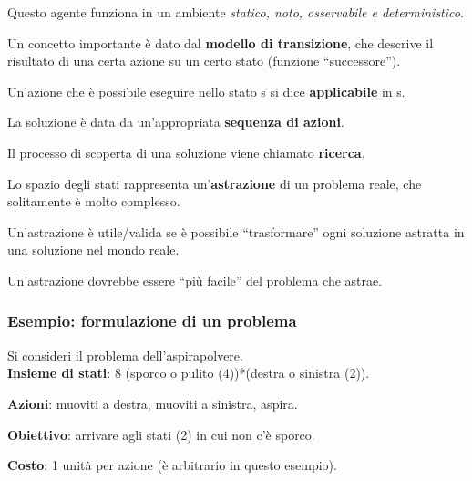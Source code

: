 Questo agente funziona in un ambiente \textit{statico, noto, osservabile e
deterministico}.

Un concetto importante è dato dal \textbf{modello di transizione}, che
descrive il risultato di una certa azione su un certo stato
(funzione ``successore'').

Un'azione che è possibile eseguire nello stato s si dice \textbf{applicabile}
in s.

La soluzione è data da un'appropriata \textbf{sequenza di azioni}.

Il processo di scoperta di una soluzione viene chiamato \textbf{ricerca}.

Lo spazio degli stati rappresenta un'\textbf{astrazione} di un problema reale,
che solitamente è molto complesso.

Un'astrazione è utile/valida se è possibile ``trasformare'' ogni soluzione
astratta in una soluzione nel mondo reale.

Un'astrazione dovrebbe essere ``più facile'' del problema che astrae.

\subsubsection{Esempio: formulazione di un problema}

Si consideri il problema dell'aspirapolvere. \\

\textbf{Insieme di stati}: 8 (sporco o pulito (4))*(destra o sinistra (2)).

\textbf{Azioni}: muoviti a destra, muoviti a sinistra, aspira.

\textbf{Obiettivo}: arrivare agli stati (2) in cui non c'è sporco.

\textbf{Costo}: 1 unità per azione (è arbitrario in questo esempio).

